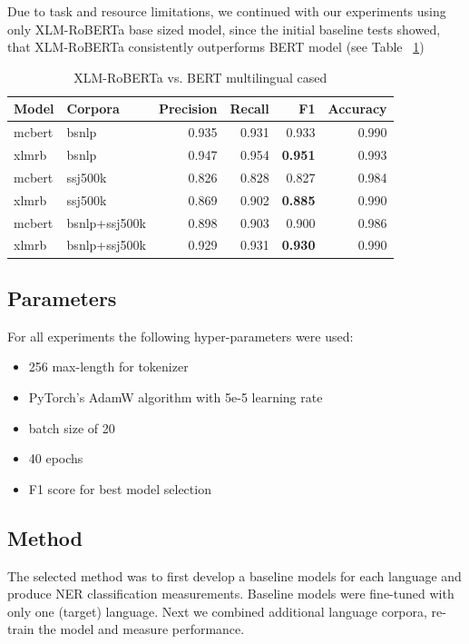\documentclass[sigconf]{acmart}
\begin{document}
Due to task and resource limitations, we continued with our experiments using only XLM-RoBERTa base sized model,
since the initial baseline tests showed, that XLM-RoBERTa consistently outperforms BERT model (see Table ~\ref{tab:roberta_vs_bert})

\begin{table}[H]
  \caption{XLM-RoBERTa vs. BERT multilingual cased}
  \label{tab:roberta_vs_bert}
  \begin{tabular}{llrrrr}
    \toprule
    Model&Corpora&Precision&Recall&F1&Accuracy\\
    \midrule
    mcbert&bsnlp&0.935&0.931&0.933&0.990\\
    xlmrb&bsnlp&0.947&0.954&\textbf{0.951}&0.993\\
    \midrule
    mcbert&ssj500k&0.826&0.828&0.827&0.984\\
    xlmrb&ssj500k&0.869&0.902&\textbf{0.885}&0.990\\
    \midrule
    mcbert&bsnlp+ssj500k&0.898&0.903&0.900&0.986\\
    xlmrb&bsnlp+ssj500k&0.929&0.931&\textbf{0.930}&0.990\\
    \bottomrule
  \end{tabular}
\end{table}

\subsection{Parameters}
For all experiments the following hyper-parameters were used:
\begin{itemize}
  \item 256 max-length for tokenizer
  \item PyTorch's AdamW algorithm with 5e-5 learning rate
  \item batch size of 20
  \item 40 epochs
  \item F1 score for best model selection
\end{itemize}

\subsection{Method}
The selected method was to first develop a baseline models for each language and produce NER classification measurements.
Baseline models were fine-tuned with only one (target) language.
Next we combined additional language corpora, re-train the model and measure performance.
\end{document}
